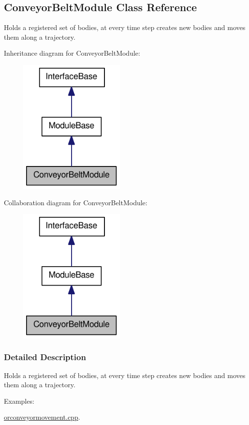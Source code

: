 \hypertarget{classConveyorBeltModule}{
\subsection{ConveyorBeltModule Class Reference}
\label{classConveyorBeltModule}
}


Holds a registered set of bodies, at every time step creates new bodies and moves them along a trajectory.  




Inheritance diagram for ConveyorBeltModule:\nopagebreak
\begin{figure}[H]
\begin{center}
\leavevmode
\includegraphics[width=150pt]{classConveyorBeltModule__inherit__graph}
\end{center}
\end{figure}


Collaboration diagram for ConveyorBeltModule:\nopagebreak
\begin{figure}[H]
\begin{center}
\leavevmode
\includegraphics[width=150pt]{classConveyorBeltModule__coll__graph}
\end{center}
\end{figure}


\subsubsection{Detailed Description}
Holds a registered set of bodies, at every time step creates new bodies and moves them along a trajectory. \begin{Desc}
\item[Examples: ]\par


\hyperlink{orconveyormovement_8cpp-example}{orconveyormovement.cpp}.

\end{Desc}
